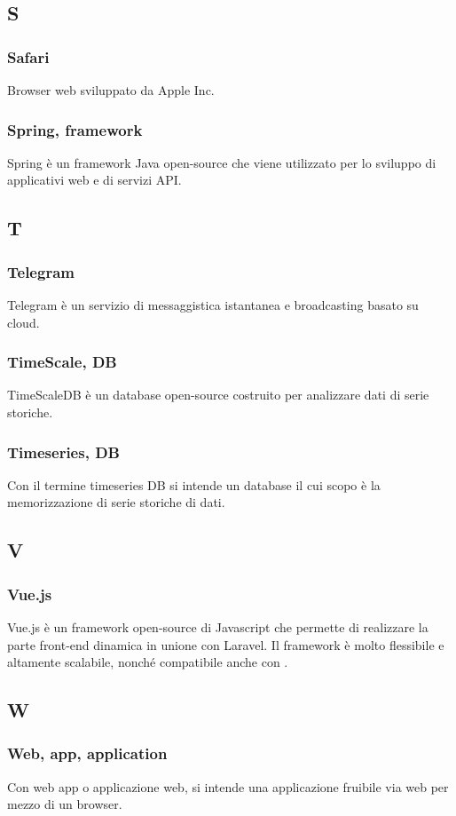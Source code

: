 \subsection{S}
\subsubsection{Safari}
Browser web sviluppato da Apple Inc.
\subsubsection{Spring, framework}  Spring è un framework Java open-source che viene utilizzato per lo sviluppo di applicativi web e di servizi API.
\subsection{T}
\subsubsection{Telegram}  Telegram è un servizio di messaggistica istantanea e broadcasting basato su cloud.
\subsubsection{TimeScale, DB}  TimeScaleDB è un database open-source costruito per analizzare dati di serie storiche.
\subsubsection{Timeseries, DB}  Con il termine timeseries DB si intende un database il cui scopo è la memorizzazione di serie storiche di dati.
\subsection{V}
\subsubsection{Vue.js}  Vue.js è un framework open-source di Javascript che permette di realizzare la parte front-end dinamica in unione con Laravel. Il framework è molto flessibile e altamente scalabile, nonché compatibile anche con .
\subsection{W}
\subsubsection{Web, app, application}
Con web app o applicazione web, si intende una applicazione fruibile via web per mezzo di un browser.